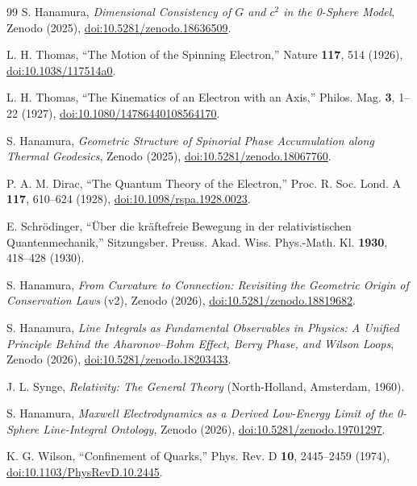 \documentclass[%
 reprint, amsmath,amssymb, aps, prb, ]{revtex4-2}
\numberwithin{equation}{section}
\begin{document}
\begin{thebibliography}{99}
S. Hanamura, \emph{Dimensional Consistency of $G$ and $c^2$ in the 0-Sphere Model}, Zenodo (2025), \href{https://doi.org/10.5281/zenodo.18636509}{doi:10.5281/zenodo.18636509}.

L. H. Thomas, ``The Motion of the Spinning Electron,'' Nature \textbf{117}, 514 (1926), \href{https://doi.org/10.1038/117514a0}{doi:10.1038/117514a0}.

L. H. Thomas, ``The Kinematics of an Electron with an Axis,'' Philos. Mag. \textbf{3}, 1--22 (1927), \href{https://doi.org/10.1080/14786440108564170}{doi:10.1080/14786440108564170}.

S. Hanamura, \emph{Geometric Structure of Spinorial Phase Accumulation along Thermal Geodesics}, Zenodo (2025), \href{https://doi.org/10.5281/zenodo.18067760}{doi:10.5281/zenodo.18067760}.

P. A. M. Dirac, ``The Quantum Theory of the Electron,'' Proc. R. Soc. Lond. A \textbf{117}, 610--624 (1928), \href{https://doi.org/10.1098/rspa.1928.0023}{doi:10.1098/rspa.1928.0023}.

E. Schr\"odinger, ``\"Uber die kr\"aftefreie Bewegung in der relativistischen Quantenmechanik,'' Sitzungsber. Preuss. Akad. Wiss. Phys.-Math. Kl. \textbf{1930}, 418--428 (1930).

S. Hanamura, \emph{From Curvature to Connection: Revisiting the Geometric Origin of Conservation Laws} (v2), Zenodo (2026), \href{https://doi.org/10.5281/zenodo.18819682}{doi:10.5281/zenodo.18819682}.

S. Hanamura, \emph{Line Integrals as Fundamental Observables in Physics: A Unified Principle Behind the Aharonov--Bohm Effect, Berry Phase, and Wilson Loops}, Zenodo (2026), \href{https://doi.org/10.5281/zenodo.18203433}{doi:10.5281/zenodo.18203433}.

J. L. Synge, \emph{Relativity: The General Theory} (North-Holland, Amsterdam, 1960).

S. Hanamura, \emph{Maxwell Electrodynamics as a Derived Low-Energy Limit of the 0-Sphere Line-Integral Ontology}, Zenodo (2026), \href{https://doi.org/10.5281/zenodo.19701297}{doi:10.5281/zenodo.19701297}.

K. G. Wilson, ``Confinement of Quarks,'' Phys. Rev. D \textbf{10}, 2445--2459 (1974), \href{https://doi.org/10.1103/PhysRevD.10.2445}{doi:10.1103/PhysRevD.10.2445}.


\end{thebibliography}
\end{document}
